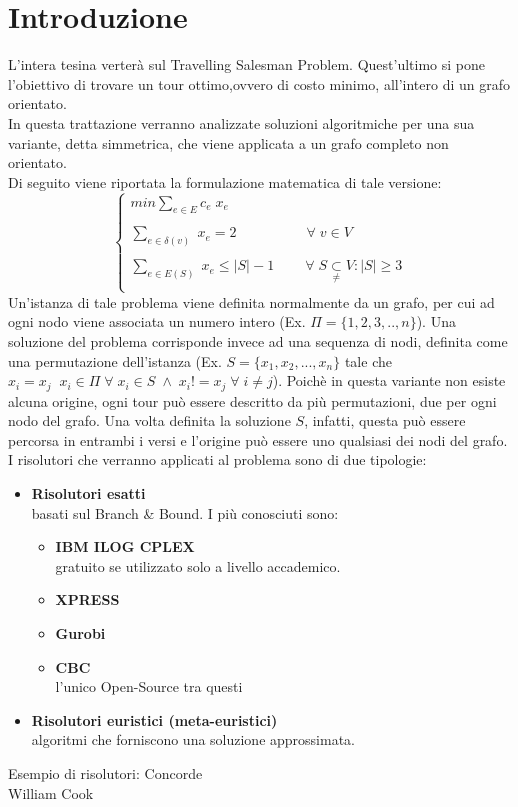 \chapter{Introduzione}
L'intera tesina verterà sul Travelling Salesman Problem. Quest'ultimo si pone l'obiettivo di trovare un tour ottimo,ovvero di costo minimo, all'intero di un grafo orientato.\\
In questa trattazione verranno analizzate soluzioni algoritmiche per una sua variante, detta simmetrica, che viene applicata a un grafo completo non orientato.\\ Di seguito viene riportata la formulazione matematica di tale versione:
$$
\begin{cases}
min \underset{e\in E}\sum{c_e\;x_e} \\\\
\underset{e\in \delta(v)}\sum{\;x_e} = 2\;\;\;\;\;\;\;\;\;\;\;\;\;\;\;\;\;\;\forall\;v\in V \\\\
\underset{e\in E(S)}\sum{\;x_e} \leq \vert S\vert - 1\;\;\;\;\;\;\;\;\forall\;S\underset{\neq} \subset V: \vert S\vert\geq 3\\
\end{cases}
$$
Un'istanza di tale problema viene definita normalmente da un grafo, per cui ad ogni nodo viene associata un numero intero (Ex. $\Pi = \{1,2,3,..,n\}$). 
Una soluzione del problema corrisponde invece ad una sequenza di nodi, definita come una permutazione dell'istanza (Ex. $S = \{x_1,x_2,...,x_n\}$ tale che $x_i=x_j\;\;x_i \in \Pi\;\forall\;x_i\in S\;\wedge\; x_i!=x_j\;\forall\;i\neq j$). Poichè in questa variante non esiste alcuna origine, ogni tour può essere descritto da più permutazioni, due per ogni nodo del grafo. Una volta definita la soluzione $S$, infatti, questa può essere percorsa in entrambi i versi e l'origine può essere uno qualsiasi dei nodi del grafo.\\
I risolutori che verranno applicati al problema sono di due tipologie:
\begin{itemize}
\item{\textbf{Risolutori esatti}\\ basati sul Branch \& Bound. I più conosciuti sono:
\begin{itemize}
\item{\textbf{IBM ILOG CPLEX}\\
gratuito se utilizzato solo a livello accademico.}
\item{\textbf{XPRESS}}
\item{\textbf{Gurobi}}
\item{\textbf{CBC}\\
l'unico Open-Source tra questi}
\end{itemize}
}
\item{\textbf{Risolutori euristici (meta-euristici)}\\
algoritmi che forniscono una soluzione approssimata.}
\end{itemize}
Esempio di risolutori: Concorde \cite{concorde}\\
William Cook \cite{cook}\\